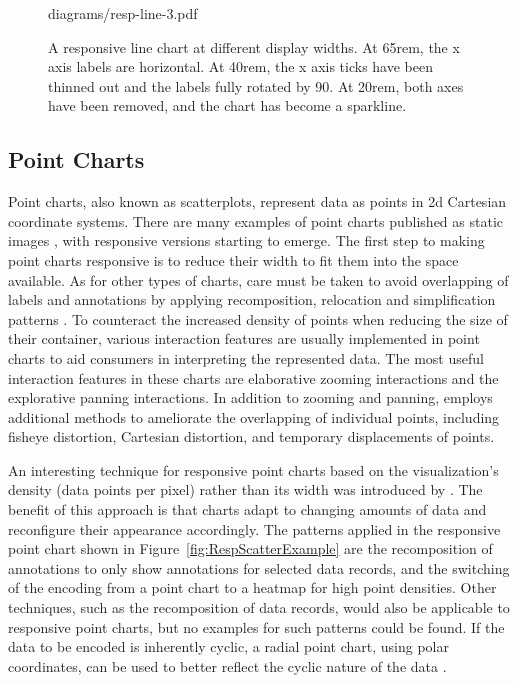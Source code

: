 \begin{figure}[tp]
{{diagrams/resp-line-3.pdf}%
\label{fig:RespLineExample3}%
}
\caption[Responsive Line Chart Example]
{
A responsive line chart at different display widths.
 At 65rem, the x axis labels are
horizontal.   At 40rem, the x axis ticks
have been thinned out and the labels fully rotated by 90\textdegree.
 At 20rem, both axes have been removed,
and the chart has become a sparkline.
}
\label{fig:RespLineExample}
\end{figure}









\subsection{Point Charts}
\label{sec:ScatterplotExamples}

Point charts, also known as scatterplots, represent data as points in
2d Cartesian coordinate systems. There are many examples of
point charts published as static images \parencite{Scatter,Scatter2},
with responsive versions starting to emerge. The first step to making
point charts responsive is to reduce their width to fit them into the
space available. As for other types of charts, care must be taken to
avoid overlapping of labels and annotations by applying recomposition,
relocation and simplification patterns
\parencite{RespScatter,RespScatter2}. To counteract the increased
density of points when reducing the size of their container, various
interaction features are usually implemented in point charts to aid
consumers in interpreting the represented data. The most useful
interaction features in these charts are elaborative zooming
interactions and the explorative panning interactions. In addition to
zooming and panning, \textcite{RespVis} employs additional methods to
ameliorate the overlapping of individual points, including fisheye
distortion, Cartesian distortion, and temporary displacements of
points.

An interesting technique for responsive point charts based on the
visualization's density (data points per pixel) rather than its width
was introduced by \textcite{NickRabinowitzRDV}. The benefit of this
approach is that charts adapt to changing amounts of data and
reconfigure their appearance accordingly. The patterns applied in the
responsive point chart shown in Figure~\ref{fig:RespScatterExample}
are the recomposition of annotations to only show annotations for
selected data records, and the switching of the encoding from a point
chart to a heatmap for high point densities. Other techniques, such as
the recomposition of data records, would also be applicable to
responsive point charts, but no examples for such patterns could be
found. If the data to be encoded is inherently cyclic, a radial point
chart, using polar coordinates, can be used to better reflect the
cyclic nature of the data \parencite{RespRadialScatterHLine}.



